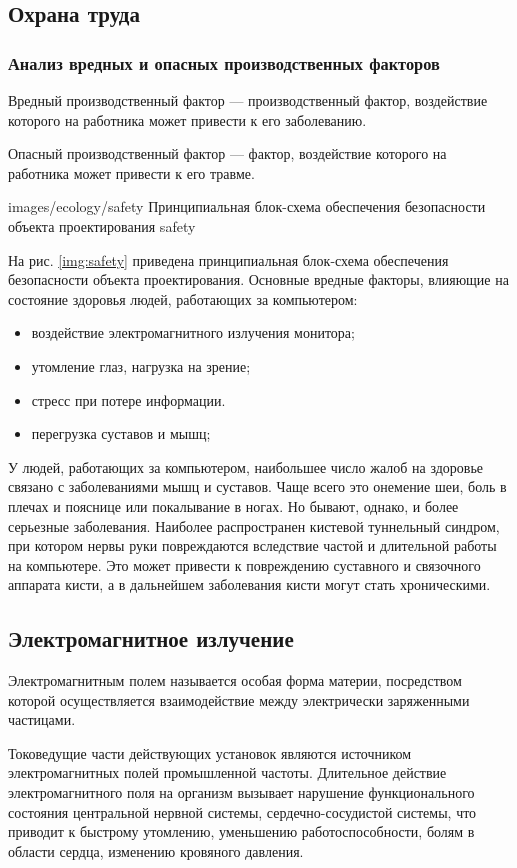 \subsection{Охрана труда}
\subsubsection{Анализ вредных и опасных производственных факторов}
Вредный производственный фактор --- производственный фактор, воздействие которого на работника может привести к его заболеванию.

Опасный производственный фактор --- фактор, воздействие которого на работника может привести к его травме.

              {images/ecology/safety}
              {Принципиальная блок-схема обеспечения безопасности объекта проектирования}
              {safety}

На рис. \ref{img:safety} приведена принципиальная блок-схема обеспечения безопасности объекта проектирования.
Основные вредные факторы, влияющие на состояние здоровья людей, работающих за компьютером:
\begin{itemize}
  \item{воздействие электромагнитного излучения монитора;}
  \item{утомление глаз, нагрузка на зрение;}
  \item{стресс при потере информации.}
  \item{перегрузка суставов и мышц;}
\end{itemize}
У людей, работающих за компьютером, наибольшее число жалоб на здоровье связано с заболеваниями мышц и суставов.
Чаще всего это онемение шеи, боль в плечах и пояснице или покалывание в ногах. Но бывают, однако, и более серьезные заболевания. Наиболее распространен кистевой туннельный синдром, при котором нервы руки повреждаются вследствие частой и длительной работы на компьютере. Это может привести к повреждению суставного и связочного аппарата кисти, а в дальнейшем заболевания кисти могут стать хроническими.

\subsection{Электромагнитное излучение}
Электромагнитным полем называется особая форма материи, посредством которой осуществляется взаимодействие между электрически заряженными частицами.

Токоведущие части действующих установок являются источником электромагнитных полей промышленной частоты.
Длительное действие электромагнитного поля на организм вызывает нарушение функционального состояния центральной нервной системы, сердечно-сосудистой системы, что приводит к быстрому утомлению, уменьшению работоспособности, болям в области сердца, изменению кровяного давления.

